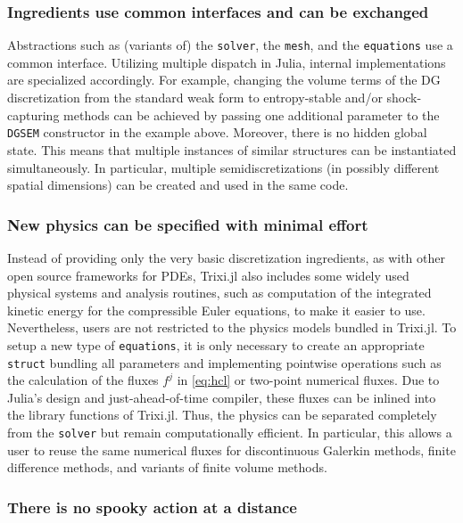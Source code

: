 \documentclass{juliacon}
\newcommand{\trixi}{Trixi.jl\xspace}
\begin{document}
\subsubsection{Ingredients use common interfaces and can be exchanged}

Abstractions such as (variants of) the \lstinline{solver}, the \lstinline{mesh},
and the \lstinline{equations} use a common interface. Utilizing multiple
dispatch in Julia, internal implementations are specialized accordingly. For
example, changing the volume terms of the DG discretization from the standard
weak form to entropy-stable and/or shock-capturing methods can be achieved by
passing one additional parameter to the \lstinline{DGSEM} constructor in the
example above. Moreover, there is no hidden global state. This means that multiple instances
of similar structures can be instantiated simultaneously. In particular, multiple
semidiscretizations (in possibly different spatial dimensions) can be created
and used in the same code.

\subsubsection{New physics can be specified with minimal effort}

Instead of providing only the very basic discretization ingredients, as with
other open source frameworks for PDEs, \trixi also includes some widely used
physical systems and analysis routines, such as computation of the integrated kinetic energy
for the compressible Euler equations,
to make it easier to use. Nevertheless, users are not restricted
to the physics models bundled in \trixi. To setup a new type of \lstinline{equations},
it is only necessary to create an appropriate \lstinline{struct} bundling all
parameters and implementing pointwise operations such as the calculation of
the fluxes $f^j$ in \eqref{eq:hcl} or two-point numerical fluxes. Due to Julia's
design and just-ahead-of-time compiler, these fluxes can be inlined into the
library functions of \trixi. Thus, the physics can be separated completely from
the \lstinline{solver} but remain computationally efficient. In particular, this allows
a user to reuse the same numerical fluxes for discontinuous Galerkin methods, finite
difference methods, and variants of finite volume methods.

\subsubsection{There is no spooky action at a distance}
\end{document}
